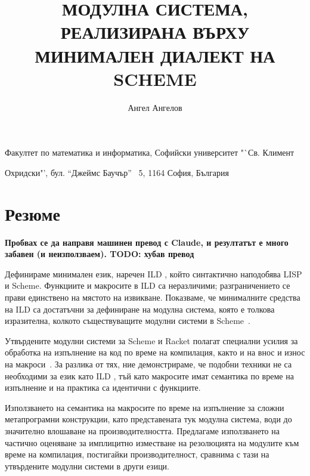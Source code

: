 \documentclass[11pt,a4paper]{amsart}
\title{\MakeUppercase{Модулна система, реализирана върху минимален диалект на Scheme}}
\author{Ангел Ангелов}
\theoremstyle{definition}
\begin{document}
\newcommand\FMI{Факултет по математика и информатика,
Софийски университет "`Св. Климент\par Охридски"',
бул. "`Джеймс Баучър"' \No~5, 1164 София, България}

\newcommand\NSF{Фонд "`Научни изследвания"' при МОН\xspace}

\newcommand\SUF{Фонд "`Научни изследвания"' при СУ "`Св. Климент Охридски"'\xspace}

\renewcommand\emailaddrname{{\itshape E-mail}}

\newcommand\lang{ILD }

\maketitle
\begin{center}
\FMI
\end{center}

\thispagestyle{empty}

\bigskip

\section*{Резюме%
}

\bigskip

\textbf{Пробвах се да направя машинен превод с Claude, и резултатът е много
забавен (и неизползваем). TODO: хубав превод}

Дефинираме минимален език, наречен \lang, който синтактично наподобява LISP и
Scheme. Функциите и макросите в \lang са неразличими; разграничението се прави
единствено на мястото на извикване. Показваме, че минималните средства на \lang
са достатъчни за дефиниране на модулна система, която е толкова изразителна,
колкото съществуващите модулни системи в Scheme~\cite{r6rs}.

Утвърдените модулни системи за Scheme и Racket полагат специални усилия за
обработка на изпълнение на код по време на компилация, както и на внос и износ
на макроси~\cite{module-system-for-scheme}\cite{submodules-in-racket}. За
разлика от тях, ние демонстрираме, че подобни техники не са необходими за език
като \lang, тъй като макросите имат семантика по време на изпълнение и на
практика са идентични с функциите.

Използването на семантика на макросите по време на изпълнение за сложни
метапрограмни конструкции, като представената тук модулна система, води до
значително влошаване на производителността. Предлагаме използването на частично
оценяване за имплицитно изместване на резолюцията на модулите към време на
компилация, постигайки производителност, сравнима с тази на утвърдените модулни
системи в други езици.

\pagebreak
\thispagestyle{plain}

\printbibliography[title={Литература}]

\bigskip
\end{document}
